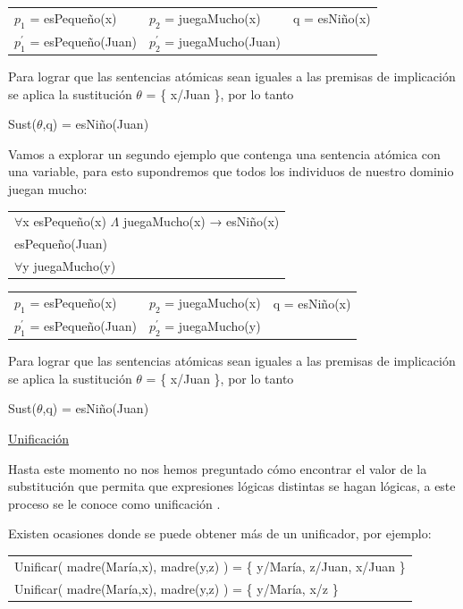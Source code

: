 \documentclass[11pt,fleqn]{book} %
\begin{document}
\begin{tabular}{lll}
	$p_1$ = esPequeño(x) & $p_2$ = juegaMucho(x) & q = esNiño(x)\\
$p_{1}^{'}$ = esPequeño(Juan) & $p_{2}^{'}$ = juegaMucho(Juan) & 	\\

\end{tabular}

Para lograr que las sentencias atómicas sean iguales a las premisas de implicación se aplica la sustitución $\theta$ = \{ x/Juan \}, por lo tanto

Sust($\theta$,q) = esNiño(Juan)

\clearpage

Vamos a explorar un segundo ejemplo que contenga una sentencia atómica con una variable, para esto supondremos que todos los individuos de nuestro dominio juegan mucho:

\begin{tabular}{l}
	$\forall$x esPequeño(x) $\Lambda$ juegaMucho(x) → esNiño(x)\\
	esPequeño(Juan)\\
	$\forall$y juegaMucho(y)\\
\end{tabular}


\begin{tabular}{lll}
	$p_1$ = esPequeño(x) & $p_2$ = juegaMucho(x) & q = esNiño(x)\\
$p_{1}^{'}$ = esPequeño(Juan) & $p_{2}^{'}$ = juegaMucho(y) & 	\\

\end{tabular}

Para lograr que las sentencias atómicas sean iguales a las premisas de implicación se aplica la sustitución $\theta$ = \{ x/Juan \}, por lo tanto

Sust($\theta$,q) = esNiño(Juan)

\underline{Unificación}

Hasta este momento no nos hemos preguntado cómo encontrar el valor de la substitución que permita que expresiones lógicas distintas se hagan lógicas, a este proceso se le conoce como unificación \cite{russell2004inteligencia}.

Existen ocasiones donde se puede obtener más de un unificador, por ejemplo:

\begin{tabular}{l}
	Unificar( madre(María,x), madre(y,z) ) = \{ y/María, z/Juan, x/Juan \} \\
	Unificar( madre(María,x), madre(y,z) ) = \{ y/María, x/z \} \\
\end{tabular}
\end{document}
